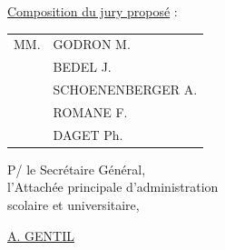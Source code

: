\uline{Composition du jury proposé} : \begin{tabular}[t]{ll}
MM. & GODRON M.\\
& BEDEL J.\\
& SCHOENENBERGER A.\\
& ROMANE F.\\
& DAGET Ph.
\end{tabular}

\begin{flushright}
P/ le Secrétaire Général,\\
l'Attachée principale d'administration\\
scolaire et universitaire,


\uline{A. GENTIL}
\end{flushright}

